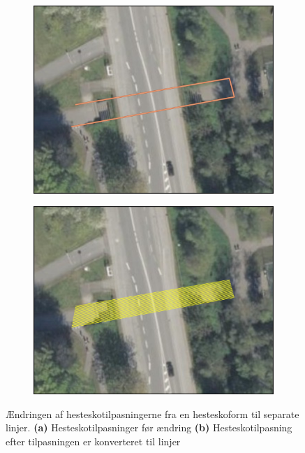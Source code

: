 \begin{figure}[H]
    \begin{subfigure}[t]{0.5\textwidth}
        \centering
        \includegraphics[width=1\linewidth]{images/databeskrivelse/hestesko.jpg}
        \caption{}
        \label{Subfig: Hesteskotilpasninger før ændring}
    \end{subfigure}
    \hspace{0.2cm}
    \begin{subfigure}[t]{0.5\textwidth}
        \centering
        \includegraphics[width=1\linewidth]{images/metode/hestesko_linjer.jpg}
        \caption{}
        \label{Subfig: Hesteskotilpasning efter tilpasningen er konverteret til linjer}
    \end{subfigure}
    \caption{Ændringen af hesteskotilpasningerne fra en hesteskoform til separate linjer. \textbf{(a)} Hesteskotilpasninger før ændring \textbf{(b)} Hesteskotilpasning efter tilpasningen er konverteret til linjer}
    \label{Figur: Ændringen af hesteskotilpasningerne}
\end{figure}

